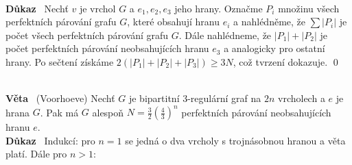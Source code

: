 \documentclass{article}
\renewcommand{\paragraph}[1]{\ \\\smallskip\noindent\textbf{#1}\ }
\begin{document}
\paragraph{Důkaz} Nechť $v$ je vrchol $G$ a $e_1, e_2, e_3$ jeho hrany. Označme 
$P_i$ množinu všech perfektních párování grafu $G$, které obsahují hranu $e_i$ a 
nahlédněme, že $\sum |P_i|$ je počet všech perfektních párování grafu $G$. Dále 
nahlédneme, že $|P_1| + |P_2|$ je počet perfektních párování neobsahujících 
hranu $e_3$ a analogicky pro ostatní hrany. Po sečtení získáme $2(|P_1| + |P_2| 
+ |P_3|) \geq 3N$, což tvrzení dokazuje.
\qed

\paragraph{Věta} (Voorhoeve)
Nechť $G$ je bipartitní 3-regulární graf na $2n$ vrcholech a $e$ je hrana $G$.  
Pak má $G$ alespoň $N = \frac{3}{2} \left( \frac{4}{3} \right)^n$ perfektních 
párování neobsahujících hranu $e$.
\paragraph{Důkaz} Indukcí: pro $n=1$ se jedná o dva vrcholy s trojnásobnou 
hranou a věta platí.
Dále pro $n>1$:
\end{document}
